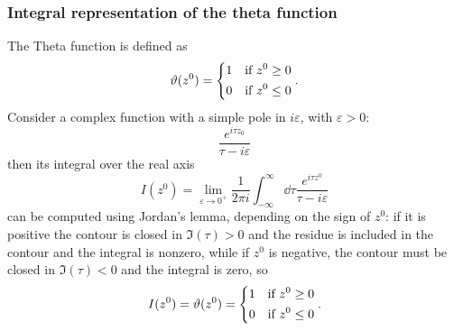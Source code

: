 \subsubsection{Integral representation of the theta function}
The Theta function is defined as
$$\vartheta(z^0)=\begin{dcases}
    1&\text{if }z^0\geq0\\
    0&\text{if }z^0\leq0
\end{dcases}.
$$
Consider a complex function with a simple pole in $i\varepsilon$, with
$\varepsilon>0$:
$$\frac{e^{i\tau z_0}}{\tau-i\varepsilon}$$
then its integral over the real axis
$$I(z^0)=\lim\limits_{\varepsilon\to0^+}\frac{1}{2\pi i}\int_{-\infty}^\infty
\dd\tau
\frac{e^{i\tau z^0}}{\tau-i\varepsilon}
$$
can be computed using Jordan's lemma,
depending on the sign of $z^0$: if it is positive the contour is closed in
$\Im(\tau)>0$ and the residue is included in the contour and the integral is
nonzero, while if $z^0$ is negative, the contour must be closed in $\Im(\tau)<0$
and the integral is zero, so
$$I(z^0) = \vartheta(z^0) =\begin{dcases}
    1&\text{if }z^0\geq0\\
    0&\text{if }z^0\leq0
\end{dcases}.
$$\\

